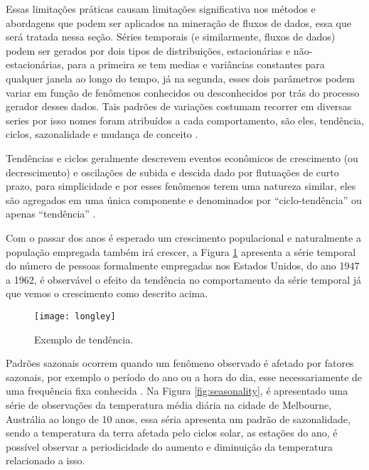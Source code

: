 Essas limitações práticas causam limitações significativa nos métodos e abordagens que podem ser aplicados na mineração de fluxos de dados, essa que será tratada nessa seção. Séries temporais (e similarmente, fluxos de dados) podem ser gerados por dois tipos de distribuições, estacionárias e não-estacionárias, para a primeira se tem medias e variâncias constantes para qualquer janela ao longo do tempo, já na segunda, esses dois parâmetros podem variar em função de fenômenos conhecidos ou desconhecidos por trás do processo gerador desses dados\cite{read2018concept}. Tais padrões de variações costumam recorrer em diversas series por isso nomes foram atribuídos a cada comportamento, são eles, tendência, ciclos, sazonalidade e mudança de conceito \cite{hyndman2018forecasting,tsymbal2004problem,brockwell2016introduction}.

Tendências e ciclos geralmente descrevem eventos econômicos de crescimento (ou decrescimento) e oscilações de subida e descida dado por flutuações de curto prazo, para simplicidade e por esses fenômenos terem uma natureza similar, eles são agregados em uma única componente e denominados por ``ciclo-tendência'' ou apenas ``tendência'' \cite{hyndman2018forecasting}.

Com o passar dos anos é esperado um crescimento populacional e naturalmente a população empregada também irá crescer, a Figura \ref{fig:trend} apresenta a série temporal do número de pessoas formalmente empregadas nos Estados Unidos, do ano 1947 a 1962, é observável o efeito da tendência no comportamento da série temporal já que vemos o crescimento como descrito acima.

\begin{figure}[ht]
    \centering
    \texttt{[image: longley]}
    \caption{Exemplo de tendência.}
    \label{fig:trend}
\end{figure}

Padrões sazonais ocorrem quando um fenômeno observado é afetado por fatores sazonais, por exemplo o período do ano ou a hora do dia, esse necessariamente de uma frequência fixa conhecida \cite{hyndman2018forecasting,brockwell2016introduction}. Na Figura \ref{fig:seasonality}, é apresentado uma série de observações da temperatura média diária na cidade de Melbourne, Austrália ao longo de 10 anos, essa séria apresenta um padrão de sazonalidade, sendo a temperatura da terra afetada pelo ciclos solar, as estações do ano, é possível observar a periodicidade do aumento e diminuição da temperatura relacionado a isso.

